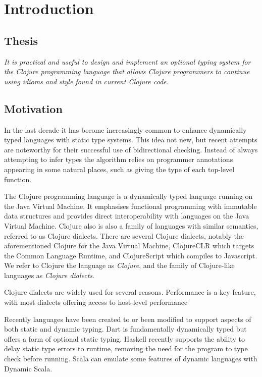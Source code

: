 \chapter{Introduction}

\section{Thesis}

\emph{It is practical and useful to design and implement an optional typing system 
for the Clojure programming language that allows Clojure programmers to continue 
using idioms and style found in current Clojure code.}

\section{Motivation}


In the last decade it has become increasingly common to enhance
dynamically typed languages with static type systems. This idea not new,
but recent attempts are noteworthy for their successful use of bidirectional checking.
Instead of always attempting to infer types the algorithm relies on programmer annotations
appearing in some natural places, such as giving the type of each top-level function.

The Clojure programming language is a dynamically typed language running on the Java Virtual Machine. 
It emphasises functional programming with immutable data structures
and provides direct interoperability with languages on the Java Virtual Machine.
Clojure also is also a family of languages with similar semantics, referred to as Clojure dialects.
There are several Clojure dialects, notably the aforementioned Clojure for the Java Virtual Machine,
ClojureCLR which targets the Common Language Runtime, and ClojureScript which compiles to Javascript.
We refer to Clojure the language as \emph{Clojure}, and the family of Clojure-like languages as
\emph{Clojure dialects}.

Clojure dialects are widely used for several reasons.
Performance is a key feature, with most dialects 
offering access to host-level performance 

Recently languages have been created to or been modified to support aspects
of both static and dynamic typing.
Dart is fundamentally dynamically typed but offers a form of optional
static typing. Haskell recently supports the ability to delay static type errors 
to runtime, removing the need for the program to type check before running.
Scala can emulate some features of dynamic languages with Dynamic Scala.

